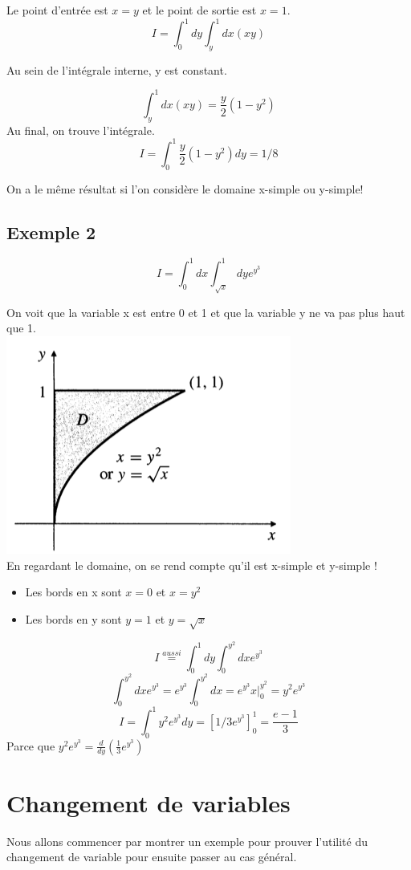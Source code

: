 Le point d'entrée est $x=y$ et le point de sortie est $x=1$.
\[I=\int_0^1dy\int_y^1dx(xy)\]

Au sein de l'intégrale interne, y est constant.

\[\int_y^1dx(xy) = \frac{y}{2}(1-y^2)\]
Au final, on trouve l'intégrale.
\[I = \int_0^1 \frac{y}{2}(1-y^2) dy = 1/8\]

On a le même résultat si l'on considère le domaine x-simple ou y-simple!

\subsection{Exemple 2}
\[I = \int_0^1dx \int_{\sqrt{x}}^1 dy e^{y^3}\]

On voit que la variable x est entre 0 et 1 et que la variable y ne va pas plus haut que 1.
\\
\includegraphics[scale=0.5]{image4.png}
\\

En regardant le domaine, on se rend compte qu'il est x-simple et y-simple !
\begin{itemize}

\item Les bords en x sont $x=0$ et $x=y^2$
\item Les bords en y sont $y=1$ et $y=\sqrt{x}$


\end{itemize}

\[I \overset{aussi}{=}\int_0^1dy \int_0^{y^2} dx e^{y^3}\]
\[\int_0^{y^2} dx e^{y^3} = e^{y^3} \int_0^{y^2} dx = e^{y^3} x \Big|_0^{y^2} = y^2 e^{y^3}\]
\[I=\int_0^1 y^2 e^{y^3} dy = \left[1/3 e ^{y^3}\right]_0^1  = \frac{e-1}{3}\]
Parce que
$y^2 e^{y^3} = \frac{d}{dy}(\frac{1}{3} e^{y^3})$

\section{Changement de variables}
Nous allons commencer par montrer un exemple pour prouver l'utilité du changement de variable pour ensuite passer au cas général.
